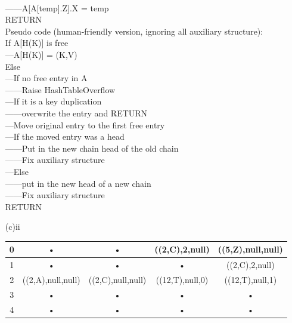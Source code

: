 \documentclass[10pt,twoside,a4paper]{article}
\begin{document}
\begin{itemize}
\\------A[A[temp].Z].X = temp
\\RETURN
\\Pseudo code (human-friendly version, ignoring all auxiliary structure):
\\If A[H(K)] is free
\\---A[H(K)] = (K,V)
\\Else
\\---If no free entry in A
\\------Raise HashTableOverflow
\\---If it is a key duplication
\\------overwrite the entry and RETURN
\\---Move original entry to the first free entry
\\---If the moved entry was a head
\\------Put in the new chain head of the old chain
\\------Fix auxiliary structure
\\---Else
\\------put in the new head of a new chain
\\------Fix auxiliary structure
\\RETURN

\item[(c)ii]
\begin{tabular}{|c|c|c|c|c|}
\hline 
0& • & • & ((2,C),2,null) & ((5,Z),null,null)\\ 
\hline 
1& • & • & • & ((2,C),2,null)\\ 
\hline 
2& ((2,A),null,null) & ((2,C),null,null) & ((12,T),null,0) & ((12,T),null,1)\\ 
\hline 
3& • & • & • & •\\ 
\hline 
4& • & • & • & •\\ 
\hline 
\end{tabular} 

\end{itemize}
\end{document}

